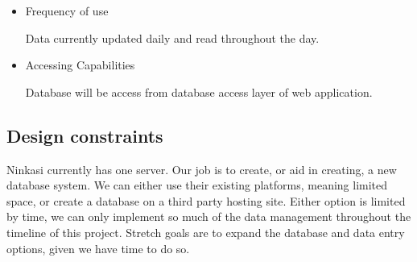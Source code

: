 \documentclass[draftclsnofoot,onecolumn,letterpaper,10pt,compsoc]{IEEEtran}
\begin{document}
\begin{itemize}
\begin{itemize}
{                    recipe for given dry hop
                    \footnote{Example: dry hop type A = 50 lb, dry hop type B = 75 lb.}
                    \footnote{Dependent on the BEER and volume in fermentation (for dry hops).}.
                }
                \item{\textbf{Amount (lb)}:
                    amount in lbs of dry hops to be added to tank.
                }
                \item{\textbf{Monitoring Points}:
                    minimally measured daily.
                }
                \begin{itemize}
                    \item{\textbf{Specific Gravity}:
                        A measure that represents the amount of sugar left in the beer.
                        This number starts high and decreases throughtout fermentation.
                        When it stops we move on to the next process step
                    }
                    \item{\textbf{pH}:
                        pH level of batch in brewing vat.
                    }
                    \item{\textbf{ABV}: Alcohol By Volumne of batch.}
                    \item{\textbf{Temp}: Temperature of batch.}
                    \item{\textbf{Action}: Action taken.}
                    \item{\textbf{By}:
                        person taking the action above.
                    }
                \end{itemize}
            \end{itemize}
        \item{Frequency of use}

            Data currently updated daily and read throughout the day.

        \item{Accessing Capabilities}

            Database will be access from database access layer of web application.
    \end{itemize}

	\subsection{Design constraints}
		Ninkasi currently has one server.
		Our job is to create, or aid in creating, a new database system.
		We can either use their existing platforms, meaning limited space, or create a database on a third party hosting site.
		Either option is limited by time, we can only implement so much of the data management throughout the timeline of this project.
		Stretch goals are to expand the database and data entry options, given we have time to do so.
\end{document}

